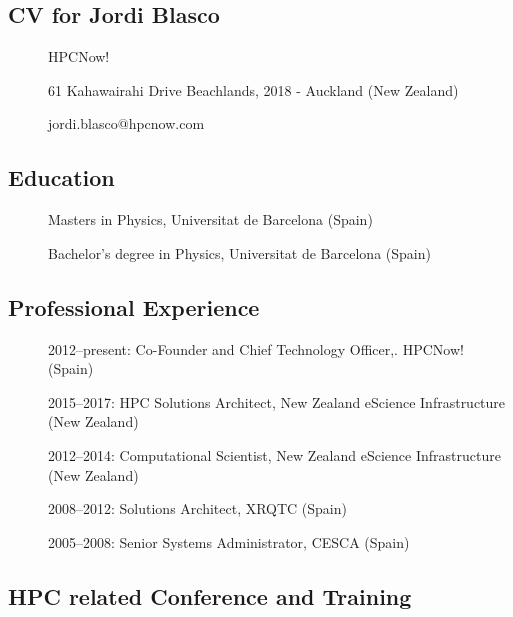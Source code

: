 
\subsection{CV for Jordi Blasco}
\begin{description}
\item[] HPCNow!
\item[] 61 Kahawairahi Drive Beachlands, 2018 - Auckland (New Zealand)
\item[] jordi.blasco@hpcnow.com
\end{description}

\subsection*{Education}
\begin{description}
    \item[] Masters in Physics, Universitat de Barcelona (Spain)
    \item[] Bachelor's degree in Physics, Universitat de Barcelona (Spain)
\end{description}

\subsection*{Professional Experience}
\begin{description}
    \item[] 2012--present: Co-Founder and Chief Technology Officer,. HPCNow! (Spain)
    \item[] 2015--2017: HPC Solutions Architect, New Zealand eScience Infrastructure (New Zealand)
    \item[] 2012--2014: Computational Scientist, New Zealand eScience Infrastructure (New Zealand)
    \item[] 2008--2012: Solutions Architect, XRQTC (Spain)
    \item[] 2005--2008: Senior Systems Administrator, CESCA (Spain)
\end{description}

\subsection*{HPC related Conference and Training}

